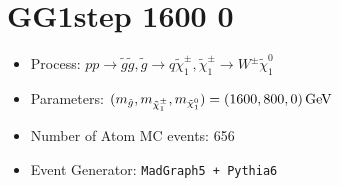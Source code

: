 \documentclass[12pt]{article}
\begin{document}
\section{GG1step 1600 0 }

\begin{itemize}
\item  Process:  $pp \to \tilde g \tilde g, \tilde g \to q \tilde \chi_1^\pm, \tilde \chi_1^\pm \to W^\pm \tilde \chi_1^0$

\item  Parameters:  $(m_{\tilde g}, m_{\tilde \chi_1^\pm}, m_{\tilde \chi_1^0}) = (1600, 800, 0) \,{\rm GeV}$

\item  Number of Atom MC events:  656

\item  Event Generator: { \tt  MadGraph5 + Pythia6
 }
\end{itemize}
\end{document}
